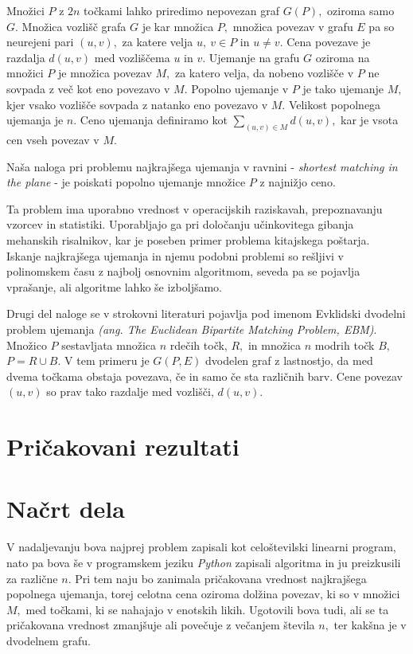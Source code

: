 \documentclass[a4paper, 11pt]{article}
\begin{document}
Množici $P$ z $2n$ točkami lahko priredimo nepovezan graf $G(P),$ oziroma samo $G.$
Množica vozlišč grafa $G$ je kar množica $P,$ množica povezav v grafu $E$ pa so neurejeni pari $(u,v),$
za katere velja $u,~v \in P$ in $u \neq v.$ 
Cena povezave je razdalja $d(u,v)$ med vozliščema $u$ in $v.$
Ujemanje na grafu $G$ oziroma na množici $P$ je množica povezav $M,$ 
za katero velja, da nobeno vozlišče v $P$ ne sovpada z več kot eno povezavo v $M.$
Popolno ujemanje v $P$ je tako ujemanje $M,$ kjer vsako vozlišče sovpada z natanko eno povezavo v $M.$
Velikost popolnega ujemanja je $n.$ 
Ceno ujemanja definiramo kot $\sum_{(u,v) \in M} d(u,v),$ kar je vsota cen vseh povezav v $M.$

Naša naloga pri problemu najkrajšega ujemanja v ravnini - \textit{shortest matching in the plane} - je poiskati
popolno ujemanje množice $P$ z najnižjo ceno.

Ta problem ima uporabno vrednost v operacijskih raziskavah, prepoznavanju vzorcev in statistiki.
Uporabljajo ga pri določanju učinkovitega gibanja mehanskih risalnikov, kar je poseben primer problema kitajskega poštarja.
Iskanje najkrajšega ujemanja in njemu podobni problemi so rešljivi v polinomskem času z najbolj osnovnim algoritmom, 
seveda pa se pojavlja vprašanje, ali algoritme lahko še izboljšamo.

Drugi del naloge se v strokovni literaturi pojavlja pod imenom Evklidski dvodelni problem ujemanja \emph{(ang. The Euclidean Bipartite Matching Problem, EBM)}.
Množico $P$ sestavljata množica $n$ rdečih točk, $R,$ in množica $n$ modrih točk $B,$ $P=R \cup B.$
V tem primeru je $G(P,E)$ dvodelen graf z lastnostjo, da med dvema točkama obstaja povezava, če in samo če sta različnih barv.
Cene povezav $(u,v)$ so prav tako razdalje med vozlišči, $d(u,v).$

\section{Pričakovani rezultati}

\section{Načrt dela}
V nadaljevanju bova najprej problem zapisali kot celoštevilski linearni program, nato pa bova še v programskem jeziku \textit{Python} zapisali algoritma in ju preizkusili za različne $n.$
Pri tem naju bo zanimala pričakovana vrednost najkrajšega popolnega ujemanja, torej celotna cena oziroma dolžina povezav, ki so v množici $M,$ med točkami, ki se nahajajo v enotskih likih.
Ugotovili bova tudi, ali se ta pričakovana vrednost zmanjšuje ali povečuje z večanjem števila $n,$ ter kakšna je v dvodelnem grafu.
\end{document}
